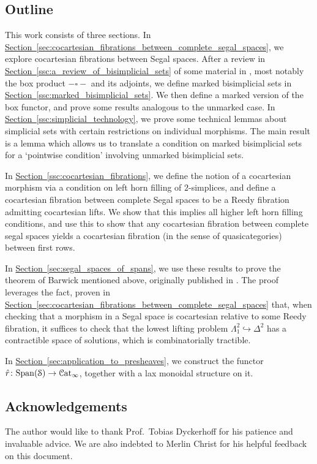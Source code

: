 \documentclass[main.tex]{subfiles}
\begin{document}
\subsection{Outline}
\label{ssc:outline}

This work consists of three sections. In \hyperref[sec:cocartesian_fibrations_between_complete_segal_spaces]{Section~\ref*{sec:cocartesian_fibrations_between_complete_segal_spaces}}, we explore cocartesian fibrations between Segal spaces. After a review in \hyperref[ssc:a_review_of_bisimplicial_sets]{Section~\ref*{ssc:a_review_of_bisimplicial_sets}} of some material in \cite{qcats_vs_segal_spaces}, most notably the box product $- \square -$ and its adjoints, we define marked bisimplicial sets in \hyperref[ssc:marked_bisimplicial_sets]{Section~\ref*{ssc:marked_bisimplicial_sets}}. We then define a marked version of the box functor, and prove some results analogous to the unmarked case. In \hyperref[ssc:simplicial_technology]{Section~\ref*{ssc:simplicial_technology}}, we prove some technical lemmas about simplicial sets with certain restrictions on individual morphisms. The main result is a lemma which allows us to translate a condition on marked bisimplicial sets for a `pointwise condition' involving unmarked bisimplicial sets.

In \hyperref[ssc:cocartesian_fibrations]{Section~\ref*{ssc:cocartesian_fibrations}}, we define the notion of a cocartesian morphism via a condition on left horn filling of $2$-simplices, and define a cocartesian fibration between complete Segal spaces to be a Reedy fibration admitting cocartesian lifts. We show that this implies all higher left horn filling conditions, and use this to show that any cocartesian fibration between complete segal spaces yields a cocartesian fibration (in the sense of quasicategories) between first rows.

In \hyperref[sec:segal_spaces_of_spans]{Section~\ref*{sec:segal_spaces_of_spans}}, we use these results to prove the theorem of Barwick mentioned above, originally published in \cite[Thm.~12.2]{spectralmackeyfunctors1}. The proof leverages the fact, proven in \hyperref[sec:cocartesian_fibrations_between_complete_segal_spaces]{Section~\ref*{sec:cocartesian_fibrations_between_complete_segal_spaces}} that, when checking that a morphism in a Segal space is cocartesian relative to some Reedy fibration, it suffices to check that the lowest lifting problem $\Lambda^{2}_{1} \hookrightarrow \Delta^{2}$ has a contractible space of solutions, which is combinatorially tractible.

In \hyperref[sec:application_to_presheaves]{Section~\ref*{sec:application_to_presheaves}}, we construct the functor $\hat{r}\colon \mathrm{Span}(\mathcal{S}) \to \mathcal{C}\mathrm{at}_{\infty}$, together with a lax monoidal structure on it.

\subsection{Acknowledgements}
\label{ssc:acknowledgements}

The author would like to thank Prof.\ Tobias Dyckerhoff for his patience and invaluable advice. We are also indebted to Merlin Christ for his helpful feedback on this document.
\end{document}
